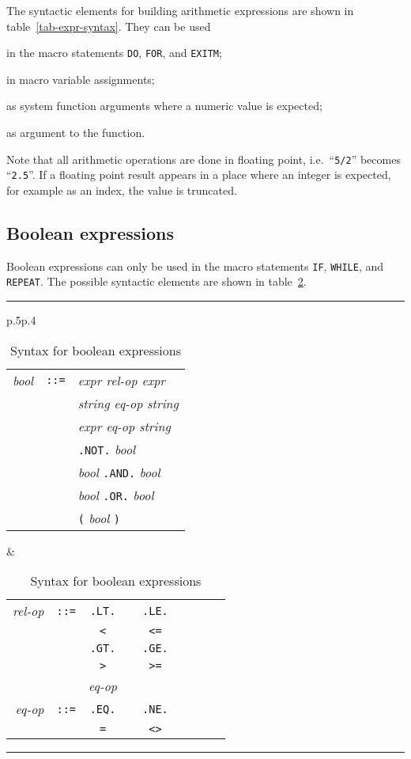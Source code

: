 The syntactic elements for building arithmetic expressions are shown
in table~\ref{tab-expr-syntax}.
They can be used
\begin{ULc}
\item
in the macro statements \texttt{DO}, \texttt{FOR}, and \texttt{EXITM};
\item 
in macro variable assignments;
\item
as system function arguments where a numeric value is expected;
\item
as argument to the  function.
\end{ULc}

Note that all arithmetic operations are done in floating point, i.e.\
``\texttt{5/2}'' becomes ``\texttt{2.5}''.
If a floating point result appears in a place where an integer is
expected, for example as an index, the value is truncated.


\subsection{Boolean expressions}

Boolean expressions can only be used in the macro statements
\texttt{IF}, \texttt{WHILE}, and \texttt{REPEAT}.
The possible syntactic elements are shown in table~\ref{tab-bool-syntax}.

\begin{table}
\hrule
\begin{tabular}{p{}p{}}
\begin{tabular}{rcl}
\textsl{bool} 
&\texttt{::=}& 
\textsl{expr rel-op expr} \\
&\verbar&  
\textsl{string eq-op string} \\
&\verbar&  
\textsl{expr eq-op string} \\
&\verbar&  
\texttt{.NOT.} \textsl{bool} \\
&\verbar&  
\textsl{bool} \texttt{.AND.} \textsl{bool} \\
&\verbar&  
\textsl{bool} \texttt{.OR.} \textsl{bool} \\
&\verbar&  
\texttt{(} \textsl{bool} \texttt{)} \\
\end{tabular} &
\begin{tabular}{rcccccccc}
\textsl{rel-op} 
&\texttt{::=}&
\texttt{.LT.} 
&\verbar& 
\texttt{.LE.} \\
&\verbar&  
\texttt{<} 
&\verbar& 
\texttt{<=} \\
&\verbar& 
\texttt{.GT.}
&\verbar& 
\texttt{.GE.} \\ 
&\verbar& 
\texttt{>} 
&\verbar& 
\texttt{>=} \\
&\verbar& 
\textsl{eq-op} \\
\textsl{eq-op} 
&\texttt{::=}& 
\texttt{.EQ.} 
&\verbar& 
\texttt{.NE.} \\
&\verbar&  
\texttt{=}  
&\verbar&  
\texttt{<>}  \\
\end{tabular}
\end{tabular}
\caption{Syntax for boolean expressions}
\label{tab-bool-syntax}
\hrule
\end{table}

